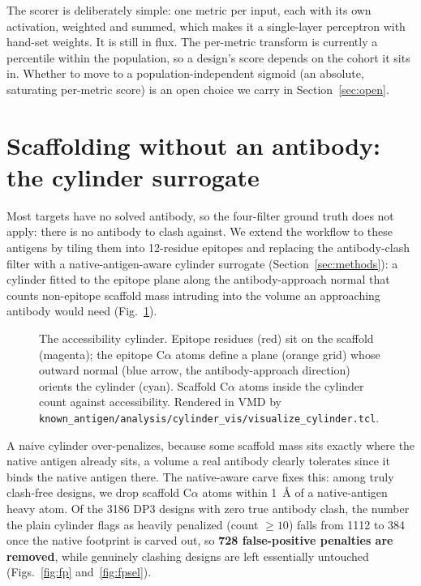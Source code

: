 The scorer is deliberately simple: one metric per input, each with its own activation,
weighted and summed, which makes it a single-layer perceptron with hand-set weights. It is
still in flux. The per-metric transform is currently a percentile within the population, so a
design's score depends on the cohort it sits in. Whether to move to a population-independent
sigmoid (an absolute, saturating per-metric score) is an open choice we carry in
Section~\ref{sec:open}.

\section{Scaffolding without an antibody: the cylinder surrogate}\label{sec:noab}
Most targets have no solved antibody, so the four-filter ground truth does not apply: there
is no antibody to clash against. We extend the workflow to these antigens by tiling them into
12-residue epitopes and replacing the antibody-clash filter with a native-antigen-aware
cylinder surrogate (Section~\ref{sec:methods}): a cylinder fitted to the epitope plane along
the antibody-approach normal that counts non-epitope scaffold mass intruding into the volume
an approaching antibody would need (Fig.~\ref{fig:cylinder}).

\begin{figure}[h]\centering
{}
\caption{The accessibility cylinder. Epitope residues (red) sit on the scaffold (magenta);
the epitope C$\alpha$ atoms define a plane (orange grid) whose outward normal (blue arrow,
the antibody-approach direction) orients the cylinder (cyan). Scaffold C$\alpha$ atoms
inside the cylinder count against accessibility. Rendered in VMD by
\texttt{known\_antigen/analysis/cylinder\_vis/visualize\_cylinder.tcl}.}
\label{fig:cylinder}
\end{figure}

A naive cylinder over-penalizes, because some scaffold mass sits exactly where the native
antigen already sits, a volume a real antibody clearly tolerates since it binds the native
antigen there. The native-aware carve fixes this: among truly clash-free designs, we drop
scaffold C$\alpha$ atoms within \SI{1}{\angstrom} of a native-antigen heavy atom. Of the
\num{3186} DP3 designs with zero true antibody clash, the number the plain cylinder flags as
heavily penalized (count $\ge 10$) falls from \num{1112} to \num{384} once the native
footprint is carved out, so \textbf{\num{728} false-positive penalties are removed}, while
genuinely clashing designs are left essentially untouched (Figs.~\ref{fig:fp}
and~\ref{fig:fpsel}).


